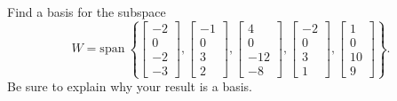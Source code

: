 \documentclass{article}
\begin{document}
\begin{exerciseStatement}
    Find a basis for the subspace
\[W=\mathrm{span}\ \left\{\left[\begin{array}{r}
-2 \\
0 \\
-2 \\
-3
\end{array}\right] , \left[\begin{array}{r}
-1 \\
0 \\
3 \\
2
\end{array}\right] , \left[\begin{array}{r}
4 \\
0 \\
-12 \\
-8
\end{array}\right] , \left[\begin{array}{r}
-2 \\
0 \\
3 \\
1
\end{array}\right] , \left[\begin{array}{r}
1 \\
0 \\
10 \\
9
\end{array}\right]\right\}.\]
 Be sure to explain why your result is a basis.


  
\end{exerciseStatement}
\end{document}
